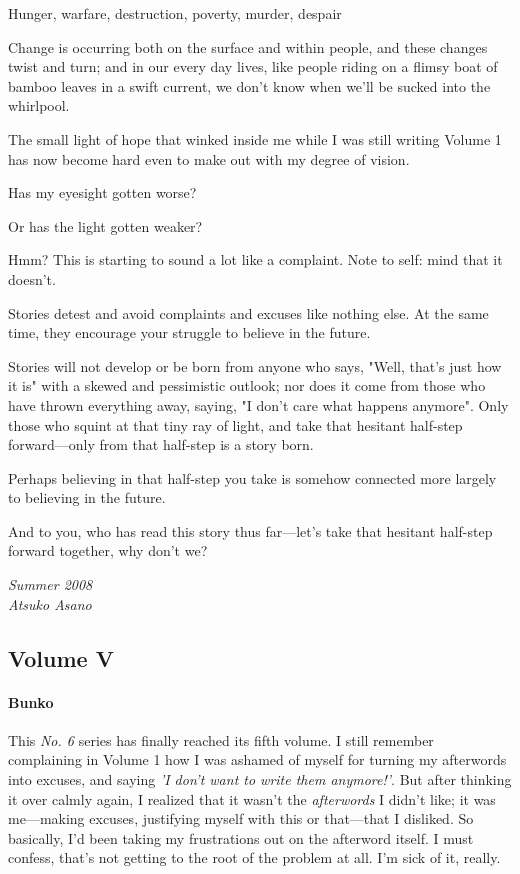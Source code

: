 Hunger, warfare, destruction, poverty, murder, despair\el 

Change is occurring both on the surface and within people, and these
changes twist and turn; and in our every day lives, like people riding
on a flimsy boat of bamboo leaves in a swift current, we don't know when
we'll be sucked into the whirlpool.

The small light of hope that winked inside me while I was still writing
Volume 1 has now become hard even to make out with my degree of vision.

Has my eyesight gotten worse?

Or has the light gotten weaker?

Hmm? This is starting to sound a lot like a complaint. Note to self:
mind that it doesn't.

Stories detest and avoid complaints and excuses like nothing else. At
the same time, they encourage your struggle to believe in the future.

Stories will not develop or be born from anyone who says, "Well, that's
just how it is" with a skewed and pessimistic outlook; nor does it come
from those who have thrown everything away, saying, "I don't care what
happens anymore". Only those who squint at that tiny ray of light, and
take that hesitant half-step forward---only from that half-step is a story
born.

Perhaps believing in that half-step you take is somehow connected more
largely to believing in the future.

And to you, who has read this story thus far---let's take that hesitant
half-step forward together, why don't we?

\myspace

\emph{Summer 2008\\
	Atsuko Asano}

\subsection{Volume V}
\paragraph{Bunko}

This \emph{No. 6} series has finally reached its fifth volume. I still remember
complaining in Volume 1 how I was ashamed of myself for turning my
afterwords into excuses, and saying \emph{'I don't want to write them
anymore!'}. But after thinking it over calmly again, I realized that it
wasn't the \emph{afterwords} I didn't like; it was me---making excuses,
justifying myself with this or that---that I disliked. So basically, I'd
been taking my frustrations out on the afterword itself. I must confess,
that's not getting to the root of the problem at all. I'm sick of it,
really.

